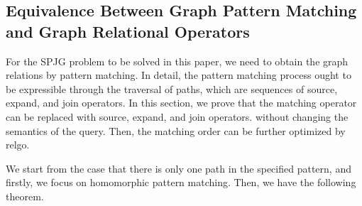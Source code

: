\iffalse
\subsection{Equivalence Between Graph Pattern Matching and Graph Relational Operators}
\label{sec:proof-gpm-gro}

For the SPJG problem to be solved in this paper, we need to obtain the graph relations by pattern matching.
In detail, the pattern matching process ought to be expressible through the traversal of paths, which are sequences of source, expand, and join operators.
In this section, we prove that the matching operator can be replaced with source, expand, and join operators. without changing the semantics of the query.
Then, the matching order can be further optimized by relgo.

We start from the case that there is only one path in the specified pattern, and firstly, we focus on homomorphic pattern matching.
Then, we have the following theorem.

